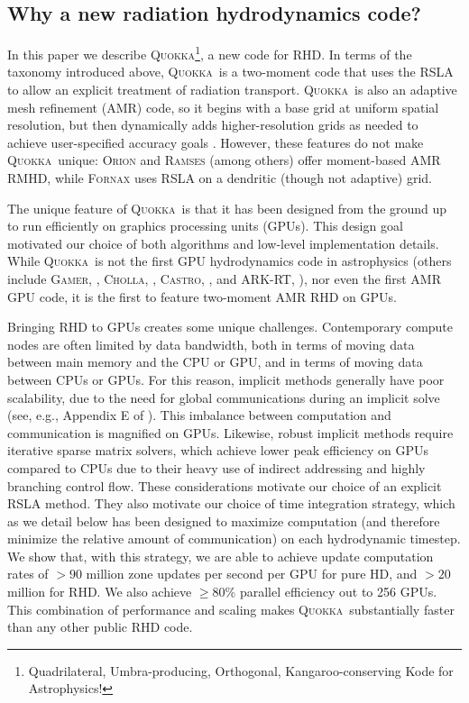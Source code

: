 \documentclass[fleqn,usenatbib]{mnras}
\newcommand{\quokka}{\textsc{Quokka}}
\begin{document}
\subsection{Why a new radiation hydrodynamics code?}

In this paper we describe \quokka\footnote{Quadrilateral, Umbra-producing, Orthogonal, Kangaroo-conserving Kode for Astrophysics!}, a new code for RHD. In terms of the taxonomy introduced above, \quokka~is a two-moment code that uses the RSLA to allow an explicit treatment of radiation transport. \quokka~is also an adaptive mesh refinement (AMR) code, so it begins with a base grid at uniform spatial resolution, but then dynamically adds higher-resolution grids as needed to achieve user-specified accuracy goals \citep{Berger:1984, Berger:1989}. However, these features do not make \quokka~unique: \textsc{Orion} and \textsc{Ramses} (among others) offer moment-based AMR RMHD, while \textsc{Fornax} uses RSLA on a dendritic (though not adaptive) grid.

The unique feature of \quokka~is that it has been designed from the ground up to run efficiently on graphics processing units (GPUs). This design goal motivated our choice of both algorithms and low-level implementation details. While \quokka~is not the first GPU hydrodynamics code in astrophysics (others include \textsc{Gamer}, \citealt{Schive10a, Schive18a}, \textsc{Cholla}, \citealt{Schneider15a}, \textsc{Castro}, \citealt{Almgren_2020}, and \textsc{ARK-RT}, \citealt{Bloch_2021}), nor even the first AMR GPU code, it is the first to feature two-moment AMR RHD on GPUs.

Bringing RHD to GPUs creates some unique challenges. Contemporary compute nodes are often limited by data bandwidth, both in terms of moving data between main memory and the CPU or GPU, and in terms of moving data between CPUs or GPUs. For this reason, implicit methods generally have poor scalability, due to the need for global communications during an implicit solve (see, e.g., Appendix E of \citealt{Skinner_2019}). This imbalance between computation and communication is magnified on GPUs. Likewise, robust implicit methods require iterative sparse matrix solvers, which achieve lower peak efficiency on GPUs compared to CPUs due to their heavy use of indirect addressing and highly branching control flow. These considerations motivate our choice of an explicit RSLA method. They also motivate our choice of time integration strategy, which as we detail below has been designed to maximize computation (and therefore minimize the relative amount of communication) on each hydrodynamic timestep. We show that, with this strategy, we are able to achieve update computation rates of $>90$ million zone updates per second per GPU for pure HD, and $>20$ million for RHD. We also achieve $\ge 80\%$ parallel efficiency out to 256 GPUs. This combination of performance and scaling makes \quokka~substantially faster than any other public RHD code.
\end{document}
